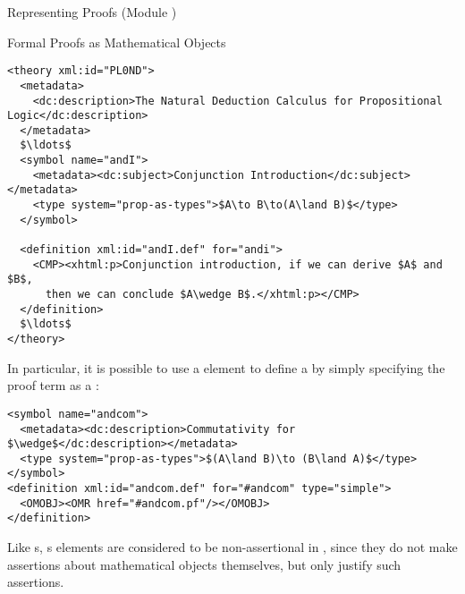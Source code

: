 \begin{tchapter}[id=proofs,short=Representing Proofs]{Representing Proofs (Module {})}
\begin{tsection}[id=proofobjects]{Formal Proofs as Mathematical Objects}
\begin{lstlisting}[label=lst:plnd,mathescape,
  caption={A Theory for Propositional Natural Deduction}]
<theory xml:id="PL0ND">
  <metadata>
    <dc:description>The Natural Deduction Calculus for Propositional Logic</dc:description>
  </metadata>
  $\ldots$
  <symbol name="andI">
    <metadata><dc:subject>Conjunction Introduction</dc:subject></metadata>
    <type system="prop-as-types">$A\to B\to(A\land B)$</type>
  </symbol>

  <definition xml:id="andI.def" for="andi">
    <CMP><xhtml:p>Conjunction introduction, if we can derive $A$ and $B$, 
      then we can conclude $A\wedge B$.</xhtml:p></CMP>
  </definition>
  $\ldots$
</theory>
\end{lstlisting}

In particular, it is possible to use a {}
element to define a {} by simply specifying the proof
term as a {}:
\begin{lstlisting}[mathescape]
<symbol name="andcom">
  <metadata><dc:description>Commutativity for $\wedge$</dc:description></metadata>
  <type system="prop-as-types">$(A\land B)\to (B\land A)$</type>
</symbol>
<definition xml:id="andcom.def" for="#andcom" type="simple">
  <OMOBJ><OMR href="#andcom.pf"/></OMOBJ>
</definition>
\end{lstlisting}
Like {s}, {s} elements are considered to be
non-assertional in {\omdoc}, since they do not make
assertions about mathematical objects themselves, but only justify such assertions.
\end{tsection}
\end{tchapter}


